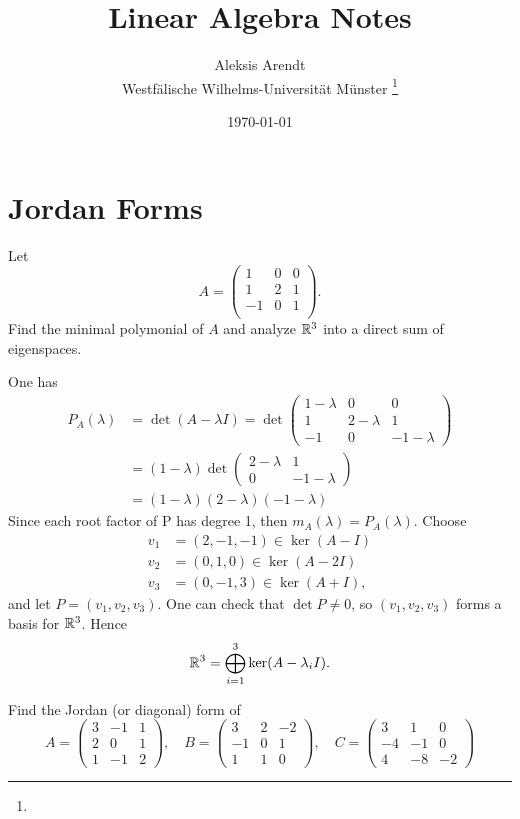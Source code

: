 ﻿\documentclass[12pt]{article}
\title{\LARGE\textbf{Linear Algebra Notes}}
\author{
  \normalsize Aleksis Arendt\\
  \normalsize Westfälische Wilhelms-Universität Münster \footnote{\authorinfo}
}
\date{\normalsize\today}
\begin{document}
\maketitle
\tableofcontents
\newpage
\section{Jordan Forms}
\begin{boxedproblem}
Let 
\[
    A = \begin{pmatrix}
        1 & 0 & 0\\
        1 & 2 & 1\\
        -1& 0 & 1\\
    \end{pmatrix}.
\]
Find the minimal polymonial of $A$ and analyze $\mathbb{R}^3$ into a direct sum of eigenspaces.
\end{boxedproblem}
\begin{sol}
One has 
\begin{align*}
    P_A(\lambda) &= \det(A - \lambda I) = \det \begin{pmatrix}
        1 - \lambda & 0 & 0\\
        1 & 2 - \lambda & 1\\
        -1 & 0 & -1 -\lambda
    \end{pmatrix}\\
    &= (1 - \lambda)\det \begin{pmatrix}
        2 - \lambda & 1\\
        0 & -1 - \lambda
    \end{pmatrix}\\
    &= (1 - \lambda)(2 - \lambda)(-1 - \lambda)
\end{align*}
Since each root factor of P has degree 1, then $m_A(\lambda) = P_A(\lambda)$. Choose 
\begin{align*}
v_1 &= (2,-1,-1)\in \ker(A - I)\\
v_2 &= (0,1,0) \in \ker(A - 2I)\\
v_3 &= (0,-1,3) \in \ker(A + I),
\end{align*}
and let $P = (v_1,v_2,v_3)$. One can check that $\det P \neq 0$, so $(v_1,v_2,v_3)$ forms a basis for $\mathbb{R}^3$. Hence 
\[
    \mathbb{R}^3 = \bigoplus_{i = 1}^3 \ker(A - \lambda_i I).
\]
\end{sol}
\begin{boxedproblem}
    Find the Jordan (or diagonal) form of 
    \[
        A = \begin{pmatrix}
            3 & -1 & 1\\
            2 & 0 & 1\\
            1 & -1 &2
        \end{pmatrix},\quad B = \begin{pmatrix}
            3 & 2 & -2\\
            -1 & 0 & 1\\
            1 & 1 & 0
        \end{pmatrix}, \quad C = \begin{pmatrix}
            3 & 1 & 0\\
            -4 & -1 & 0\\
            4  & -8 & -2
        \end{pmatrix}
    \]
\end{boxedproblem}
\end{document}
